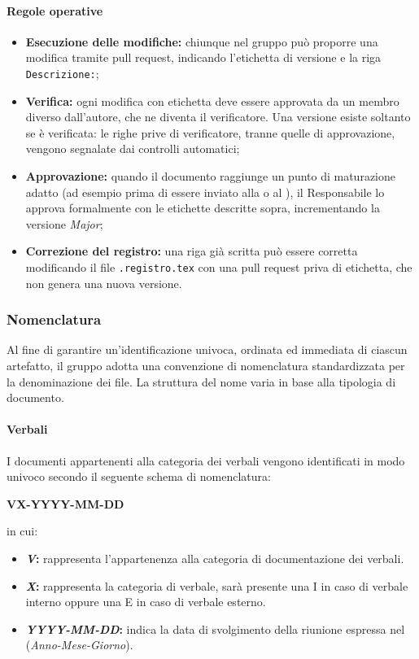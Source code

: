 \documentclass[documento]{gpt}
\begin{document}
	\paragraph{Regole operative}
	\begin{itemize}
		\item \textbf{Esecuzione delle modifiche:} chiunque nel gruppo può proporre una modifica tramite pull request, indicando l'etichetta di versione e la riga \texttt{Descrizione:};
		\item \textbf{Verifica:} ogni modifica con etichetta deve essere approvata da un membro diverso dall'autore, che ne diventa il verificatore. Una versione esiste soltanto se è verificata: le righe prive di verificatore, tranne quelle di approvazione, vengono segnalate dai controlli automatici;
		\item \textbf{Approvazione:} quando il documento raggiunge un punto di maturazione adatto (ad esempio prima di essere inviato alla  o al ), il Responsabile lo approva formalmente con le etichette descritte sopra, incrementando la versione \textit{Major};
		\item \textbf{Correzione del registro:} una riga già scritta può essere corretta modificando il file \texttt{.registro.tex} con una pull request priva di etichetta, che non genera una nuova versione.
	\end{itemize}

	\subsubsection{Nomenclatura}
	Al fine di garantire un'identificazione univoca, ordinata ed immediata di ciascun artefatto, il gruppo adotta una convenzione di nomenclatura standardizzata per la denominazione dei file. La struttura del nome varia in base alla tipologia di documento.
	
	\paragraph{Verbali}
	I documenti appartenenti alla categoria dei verbali vengono identificati in modo univoco secondo il seguente schema di nomenclatura:
	
	\begin{center}
		\sffamily\bfseries VX-YYYY-MM-DD
	\end{center}
	
	in cui:
	\begin{itemize}
		\item \textbf{\textit{V}:} rappresenta l'appartenenza alla categoria di documentazione dei verbali.
		\item \textbf{\textit{X}:} rappresenta la categoria di verbale, sarà presente una I in caso di verbale interno oppure una E in caso di verbale esterno.
		\item \textbf{\textit{YYYY-MM-DD}:} indica la data di svolgimento della riunione espressa nel  (\textit{Anno-Mese-Giorno}).
	\end{itemize}
	
\end{document}
